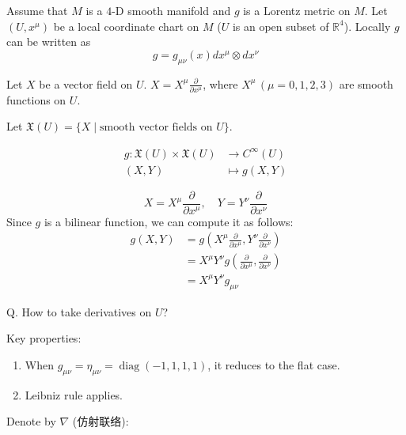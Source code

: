 Assume that $M$ is a $4$-D smooth manifold 
and $g$ is a Lorentz metric on $M$. 
Let $(U,x^{\mu})$ be a local coordinate 
chart on $M$ ($U$ is an open subset of $\mathbb{R}^4$). 
Locally $g$ can be written as 
\[g=g_{\mu\nu}(x)dx^{\mu}\otimes dx^{\nu}\]

Let $X$ be a vector field on $U$.
$X = X^\mu \frac{\partial}{\partial x^\mu}$, where $X^\mu\,(μ=0,1,2,3)$ are smooth functions on $U$.

Let \(\mathfrak{X}(U) = \{X \mid \text{smooth vector fields on } U\}\).

\begin{equation*}
    \begin{aligned}
         g : \mathfrak{X}(U) \times \mathfrak{X}(U) &\rightarrow C^\infty(U) \\
(X, Y) \quad &\mapsto g(X, Y)
    \end{aligned}
\end{equation*}



\[
X = X^\mu \frac{\partial}{\partial x^\mu}, \quad Y = Y^\nu \frac{\partial}{\partial x^\nu}
\]
Since $g$ is a bilinear function, we can compute it as follows:
\begin{equation*}
\begin{aligned}
       g(X, Y) &= g\left(X^\mu \frac{\partial}{\partial x^\mu}, Y^\nu \frac{\partial}{\partial x^\nu}\right)\\
&=  X^\mu Y^\nu  g\left(\frac{\partial}{\partial x^\mu}, \frac{\partial}{\partial x^\nu}\right)\\
&= X^\mu Y^\nu g_{\mu\nu} 
\end{aligned}
\end{equation*}



{Q.} How to take derivatives on \( U \)?

Key properties:
\begin{enumerate}[label=(\roman*)]
    \item When \( g_{\mu\nu} = \eta_{\mu\nu} = \operatorname{diag}(-1, 1, 1, 1)\), it reduces to the flat case.
    \item Leibniz rule applies.
\end{enumerate}

Denote by $\nabla$ (仿射联络):


